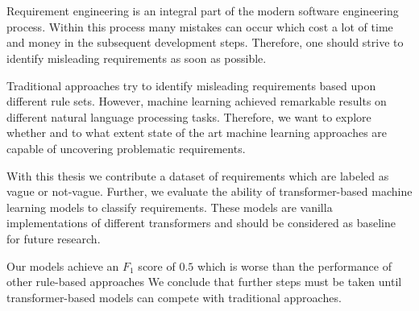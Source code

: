 \chapter{\abstractname}

Requirement engineering is an integral part of the modern software engineering process.
Within this process many mistakes can occur which cost a lot of time and money in the subsequent development steps.
Therefore, one should strive to identify misleading requirements as soon as possible.

Traditional approaches try to identify misleading requirements based upon different rule sets.
However, machine learning achieved remarkable results on different natural language processing tasks.
Therefore, we want to explore whether and to what extent state of the art machine learning approaches are capable of uncovering problematic requirements.

With this thesis we contribute a dataset of requirements which are labeled as vague or not-vague.
Further, we evaluate the ability of transformer-based machine learning models to classify requirements.
These models are vanilla implementations of different transformers and should be considered as baseline for future research.

Our models achieve an $F_1$ score of $0.5$ which is worse than the performance of other rule-based approaches
We conclude that further steps must be taken until transformer\nobreakdash-based models can compete with traditional approaches.
